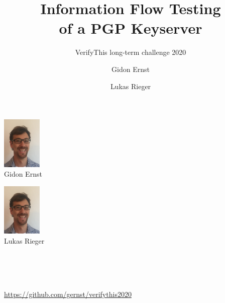 \documentclass[12pt,english,dvipsnames]{beamer}
\author{Gidon Ernst \and Lukas Rieger}
\title{Information Flow Testing\\of a PGP Keyserver}
\subtitle{VerifyThis long-term challenge 2020}
\institute[LMU Munich]{LMU Munich, Germany}
\date{}
\newcommand{\code}[1]{\text{\upshape\ttfamily#1}}
\begin{document}
\begin{frame}
    \centering
    {\Large \inserttitle}
    \bigskip

    {       \insertsubtitle}

    \bigskip

    \begin{minipage}[b]{2.5cm}
      \centering
    \includegraphics[height=2.5cm]{images/gernst} \\
    Gidon Ernst
    \end{minipage}
    \quad
    \begin{minipage}[b]{2.5cm}
      \centering
    \includegraphics[height=2.5cm]{images/gernst} \\
    Lukas Rieger
    \end{minipage}
    \quad
    \begin{minipage}[b]{3cm}
      \centering
    \resizebox{!}{1cm}{} \\[1em]
    \resizebox{!}{1cm}{}  \\[1em]
    \end{minipage}

    \bigskip

     \quad {} \\
    \url{https://github.com/gernst/verifythis2020}
\end{frame}

\end{document}
